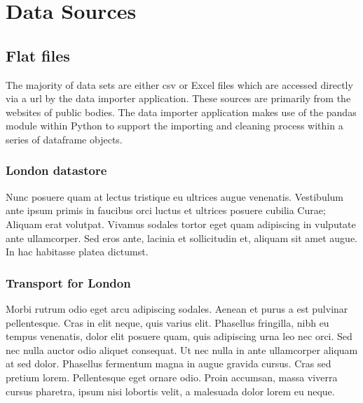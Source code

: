 
\chapter{Data Sources} %

\label{Chapter3} %


\section{Flat files}

The majority of data sets are either csv or Excel files which are accessed directly via a url by the data importer application. These sources are primarily from the websites of public bodies. The data importer application makes use of the pandas module within Python to support the importing and cleaning process within a series of dataframe objects.

\subsection{London datastore}

Nunc posuere quam at lectus tristique eu ultrices augue venenatis. Vestibulum ante ipsum primis in faucibus orci luctus et ultrices posuere cubilia Curae; Aliquam erat volutpat. Vivamus sodales tortor eget quam adipiscing in vulputate ante ullamcorper. Sed eros ante, lacinia et sollicitudin et, aliquam sit amet augue. In hac habitasse platea dictumst.


\subsection{Transport for London}
Morbi rutrum odio eget arcu adipiscing sodales. Aenean et purus a est pulvinar pellentesque. Cras in elit neque, quis varius elit. Phasellus fringilla, nibh eu tempus venenatis, dolor elit posuere quam, quis adipiscing urna leo nec orci. Sed nec nulla auctor odio aliquet consequat. Ut nec nulla in ante ullamcorper aliquam at sed dolor. Phasellus fermentum magna in augue gravida cursus. Cras sed pretium lorem. Pellentesque eget ornare odio. Proin accumsan, massa viverra cursus pharetra, ipsum nisi lobortis velit, a malesuada dolor lorem eu neque.

